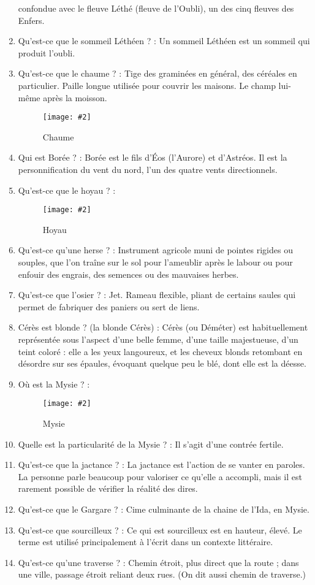 \documentclass[a4paper, 11pt, hidelinks]{article}
\newcommand{\img}[4]{\begin{figure}[!ht]
    \centering
    \texttt{[image: \#2]}
    \caption{#3}
    \label{#4}
    \end{figure} }
\begin{document}
\begin{enumerate}
            confondue avec le fleuve Léthé (fleuve de l'Oubli), un des cinq fleuves des Enfers.
      \item Qu'est-ce que le sommeil Léthéen ? : Un sommeil Léthéen est un sommeil qui produit l'oubli.
      \item Qu'est-ce que le chaume ? : Tige des graminées en général, des céréales en particulier. Paille longue utilisée pour couvrir les maisons.
            Le champ lui-même après la moisson.
            \img{0.5}{Chaume.jpg}{Chaume}{20}
      \item Qui est Borée ? : Borée est le fils d'Éos (l'Aurore) et d'Astréos. Il est la personnification du vent du nord,
            l'un des quatre vents directionnels.
      \item Qu'est-ce que le hoyau ? : \img{0.5}{Hoyau.jpg}{Hoyau}{21}
      \item Qu'est-ce qu'une herse ? : Instrument agricole muni de pointes rigides ou souples, que l'on traîne sur le sol pour
            l'ameublir après le labour ou pour enfouir des engrais, des semences ou des mauvaises herbes.
      \item Qu'est-ce que l'osier ? : Jet. Rameau flexible, pliant de certains saules qui permet de fabriquer des paniers ou sert de liens.
      \item Cérès est blonde ? (la blonde Cérès) : Cérès (ou Déméter) est habituellement représentée sous l'aspect d’une belle femme,
            d'une taille majestueuse, d'un teint coloré : elle a les yeux langoureux, et les cheveux blonds retombant en désordre sur ses
            épaules, évoquant quelque peu le blé, dont elle est la déesse.
      \item Où est la Mysie ? : \img{0.4}{Mysie.png}{Mysie}{22}
      \item Quelle est la particularité de la Mysie ? : Il s'agit d'une contrée fertile.
      \item Qu'est-ce que la jactance ? : La jactance est l'action de se vanter en paroles. La personne parle beaucoup pour
            valoriser ce qu'elle a accompli, mais il est rarement possible de vérifier la réalité des dires.
      \item Qu'est-ce que le Gargare ? : Cime culminante de la chaine de l'Ida, en Mysie.
      \item Qu'est-ce que sourcilleux ? : Ce qui est sourcilleux est en hauteur, élevé. Le terme est utilisé principalement à l'écrit dans un contexte littéraire.
      \item Qu'est-ce qu'une traverse ? : Chemin étroit, plus direct que la route ; dans une ville, passage étroit reliant deux rues. (On dit aussi chemin de traverse.)

\end{enumerate}
\end{document}
